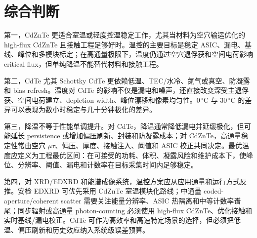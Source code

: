 \documentclass[
  aps,
  prd,
  reprint,
  superscriptaddress,
  floatfix,
  amsmath,
  amssymb
]{revtex4-2}
\newcommand{\degc}{^\circ\mathrm{C}}
\begin{document}
\section{综合判断}

第一，CdZnTe 更适合室温或轻度控温稳定工作，尤其当材料为空穴输运优化的 high-flux CdZnTe 且接触工程足够好时。温控的主要目标是稳定 ASIC、漏电、基线、峰位和多模块标定；在高通量极限下，温度仍通过空穴退俘获和空间电荷影响 critical flux，但单纯降温不能替代材料和接触工程\cite{bale2008,prokesch2016,veale2020,cline2024,greiffenberg2025}。

第二，CdTe 尤其 Schottky CdTe 更依赖低温、TEC/水冷、氮气或真空、防凝露和 bias refresh。温度对 CdTe 的影响不仅是漏电和噪声，还直接改变深受主退俘获、空间电荷建立、depletion width、峰位漂移和像素均匀性。$0\,\degc$ 与 $30\,\degc$ 的差异可以表现为数小时稳定与几十分钟极化的差异\cite{toyama2006,principato2012,astromskas2016,meyer2022}。

第三，降温不等于性能单调提升。对 CdTe，降温通常降低漏电并延缓极化，但可能延长 persistence 或增加偏压刷新、封装和防凝露成本；对 CdZnTe，高通量稳定性常由空穴 $\mu\tau$、偏压、厚度、接触注入、阈值和 ASIC 校正共同决定。最优温度应定义为工程最优区间：在可接受的功耗、体积、凝露风险和维护成本下，使峰位、分辨率、阈值、漏电和计数率在目标采集时间内足够稳定。

第四，对 XRD/EDXRD 和能谱成像系统，温控方案应从应用通量和运行方式反推。安检 EDXRD 可优先采用 CdZnTe 室温模块化路线；中通量 coded-aperture/coherent scatter 需要关注能量分辨率、ASIC 热隔离和中等计数率谱尾；同步辐射或高通量 photon-counting 必须使用 high-flux CdZnTe、优化接触和实时基线/漏电校正。CdTe 可作为高效率和高速特定场景的选择，但必须把低温、偏压刷新和历史效应纳入系统级误差预算。



\end{document}

